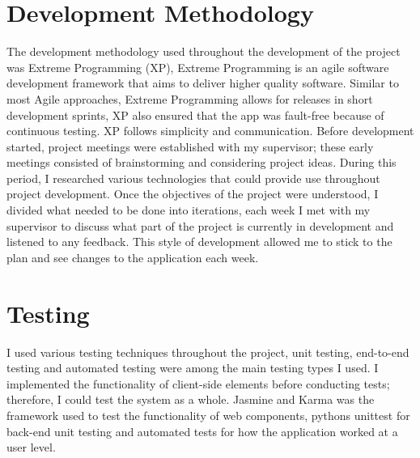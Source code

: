 \section{Development Methodology}
The development methodology used throughout the development of the project was Extreme Programming (XP), Extreme Programming is an agile software development framework that aims to deliver higher quality software. Similar to most Agile approaches, Extreme Programming allows for releases in short development sprints, XP also ensured that the app was fault-free because of continuous testing. XP follows simplicity and communication. Before development started, project meetings were established with my supervisor; these early meetings consisted of brainstorming and considering project ideas. During this period, I researched various technologies that could provide use throughout project development. Once the objectives of the project were understood, I divided what needed to be done into iterations, each week I met with my supervisor to discuss what part of the project is currently in development and listened to any feedback. This style of development allowed me to stick to the plan and see changes to the application each week.
\section{Testing}
I used various testing techniques throughout the project, unit testing, end-to-end testing and automated testing were among the main testing types I used. I implemented the functionality of client-side elements before conducting tests; therefore, I could test the system as a whole. Jasmine and Karma was the framework used to test the functionality of web components, pythons unittest for back-end unit testing and automated tests for how the application worked at a user level.

